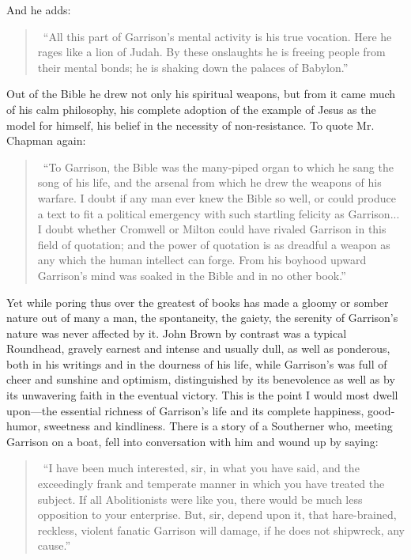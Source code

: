 \documentclass{book}
\begin{document}
And he adds:

\begin{quotation}\
	“All this part of Garrison’s mental activity is his true vocation. Here he rages like a lion of Judah. By these onslaughts he is freeing people from their mental bonds; he is shaking down the palaces of Babylon.”
\end{quotation}

Out of the Bible he drew not only his spiritual weapons, but from it came much of his calm philosophy, his complete adoption of the example of Jesus as the model for himself, his belief in the necessity of non-resistance. To quote Mr. Chapman again:

\begin{quotation}\
	“To Garrison, the Bible was the many-piped organ to which he sang the song of his life, and the arsenal from which he drew the weapons of his warfare. I doubt if any man ever knew the Bible so well, or could produce a text to fit a political emergency with such startling felicity as Garrison... I doubt whether Cromwell or Milton could have rivaled Garrison in this field of quotation; and the power of quotation is as dreadful a weapon as any which the human intellect can forge. From his boyhood upward Garrison’s mind was soaked in the Bible and in no other book.”
\end{quotation}

Yet while poring thus over the greatest of books has made a gloomy or somber nature out of many a man, the spontaneity, the gaiety, the serenity of Garrison’s nature was never affected by it. John Brown by contrast was a typical Roundhead, gravely earnest and intense and usually dull, as well as ponderous, both in his writings and in the dourness of his life, while Garrison’s was full of cheer and sunshine and optimism, distinguished by its benevolence as well as by its unwavering faith in the eventual victory. This is the point I would most dwell upon—the essential richness of Garrison’s life and its complete happiness, good-humor, sweetness and kindliness. There is a story of a Southerner who, meeting Garrison on a boat, fell into conversation with him and wound up by saying:

\begin{quotation}\
	“I have been much interested, sir, in what you have said, and the exceedingly frank and temperate manner in which you have treated the subject. If all Abolitionists were like you, there would be much less opposition to your enterprise. But, sir, depend upon it, that hare-brained, reckless, violent fanatic Garrison will damage, if he does not shipwreck, any cause.”
\end{quotation}
\end{document}
